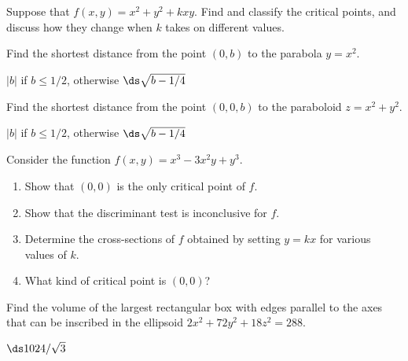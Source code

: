 \begin{enumialphparenastyle}
\begin{ex}
Suppose that $f(x,y)=x^2+y^2+kxy$. Find and classify the
  critical points, and discuss how they change when $k$ takes on
  different values.
\end{ex}

\begin{ex}
Find the shortest distance from the point $(0,b)$ to the
  parabola $y=x^2$.
\begin{sol}
$|b|$ if $b\le1/2$, otherwise $\ds\sqrt{b-1/4}$
\end{sol}
\end{ex}

\begin{ex}
Find the shortest distance from the point $(0,0,b)$ to the
  paraboloid $z=x^2+y^2$.
\begin{sol}
$|b|$ if $b\le1/2$, otherwise $\ds\sqrt{b-1/4}$
\end{sol}
\end{ex}

\begin{ex}
Consider the function $f(x,y)=x^3-3x^2y+y^3$.

\begin{enumerate}
	\item Show that $(0,0)$ is the only critical point of $f$.
	\item Show that the discriminant test is inconclusive for $f$.  
	\item Determine the cross-sections of $f$ obtained by setting $y=kx$ for
	  various values of $k$.
	\item What kind of critical point is $(0,0)$?
\end{enumerate}
\end{ex}

\begin{ex}
Find the volume of the largest rectangular box with edges
  parallel to the axes that can be inscribed in the ellipsoid
  $2x^2+72y^2+18z^2=288$.
\begin{sol}
$\ds 1024/\sqrt3$
\end{sol}
\end{ex}

\end{enumialphparenastyle}
